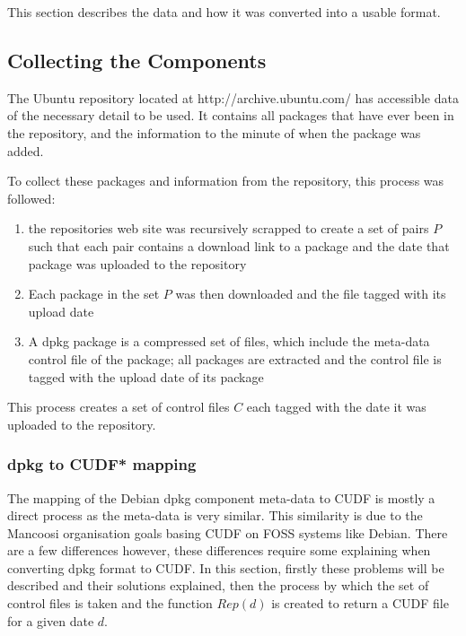 This section describes the data and how it was converted into a usable format.

\subsection{Collecting the Components}
The Ubuntu repository located at http://archive.ubuntu.com/ has accessible data of the necessary detail to be used.
It contains all packages that have ever been in the repository, and the information to the minute of when the package was added.

To collect these packages and information from the repository, this process was followed:
\begin{enumerate}
  \item the repositories web site was recursively scrapped to create a set of pairs $P$ 
  such that each pair contains a download link to a package and the date that package was uploaded to the repository
  \item Each package in the set $P$ was then downloaded and the file tagged with its upload date
  \item A dpkg package is a compressed set of files, 
  which include the meta-data control file of the package; all packages are extracted and the control file is tagged with the upload date of its package 
\end{enumerate}

This process creates a set of control files $C$ each tagged with the date it was uploaded to the repository.

\subsubsection{dpkg to CUDF* mapping}
\label{ubuntusimulation.debtocudf}
The mapping of the Debian dpkg component meta-data to CUDF is mostly a direct process as the meta-data is very similar.
This similarity is due to the Mancoosi organisation goals basing CUDF on FOSS systems like Debian.  
There are a few differences however, these differences require some explaining when converting dpkg format to CUDF.
In this section, firstly these problems will be described and their solutions explained, 
then the process by which the set of control files is taken and the function $Rep(d)$ is created to return a CUDF file for a given date $d$.

